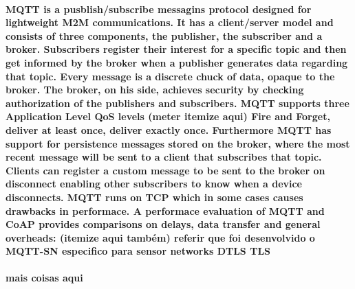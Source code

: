 \paragraph{
	\ac{MQTT} is a pusblish/subscribe messagins protocol designed for lightweight \ac{M2M} communications. It has a client/server model and consists of three components, the publisher, the subscriber and a broker.
Subscribers register their interest for a specific topic and then get informed by the broker when a publisher generates data regarding that topic. Every message is a discrete chuck of data, opaque to the broker. The broker, on his side, achieves security by checking authorization of the publishers and subscribers. \ac{MQTT} supports three Application Level \ac{QoS} levels (meter itemize aqui) Fire and Forget, deliver at least once, deliver exactly once. Furthermore \ac{MQTT} has support for persistence messages stored on the broker, where the most recent message will be sent to a client that subscribes that topic. Clients can register a custom message to be sent to the broker on disconnect enabling other subscribers to know when a device disconnects. \ac{MQTT} runs on \ac{TCP} which in some cases causes drawbacks in performace. A performace evaluation of \ac{MQTT} and \ac{CoAP} \cite{Ma2014} provides comparisons on delays, data transfer and general overheads: (itemize aqui também)
	referir que foi desenvolvido o \ac{MQTT-SN} \cite{Ibm2013} especifico para sensor networks \ac{DTLS} \ac{TLS}
}

\paragraph{mais coisas aqui}

